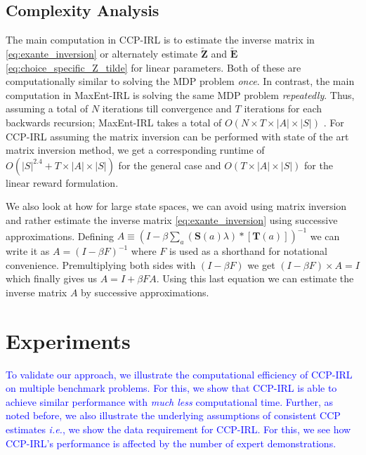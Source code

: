 \documentclass{article}
\begin{document}
\subsection{Complexity Analysis}
The main computation in CCP-IRL is to estimate the inverse matrix in \eqref{eq:exante_inversion} or alternately estimate $\tilde{\mathbf{Z}}$ and $\tilde{\mathbf{E}}$ \eqref{eq:choice_specific_Z_tilde} for linear parameters. Both of these are computationally similar to solving the MDP problem \emph{once}. 
In contrast, the main computation in MaxEnt-IRL is solving the same MDP problem \emph{repeatedly}.
Thus, assuming a total of $N$ iterations till convergence and $T$ iterations for each backwards recursion; MaxEnt-IRL takes a total of $O(N\times T \times|A|\times|S|)$ \cite{ziebart_phd}. For CCP-IRL assuming the matrix inversion can be performed with state of the art matrix inversion method, we get a corresponding runtime of $O(|S|^{2.4}+T\times|A|\times|S|)$ for the general case and $O(T\times|A|\times|S|)$ for the linear reward formulation.

We also look at how for large state spaces, we can avoid using matrix inversion and rather estimate the inverse matrix \eqref{eq:exante_inversion} using successive approximations.
Defining $A \equiv \left(I- \beta \sum_{a}(\mathbf{S}(a) \lambda) *\left[ \mathbf{T}(a)  \right]\right)^{-1}$ we can write it as $A = (I - \beta F)^{-1}$ where $F$ is used as a shorthand for notational convenience. Premultiplying both sides with $(I - \beta F)$ we get $(I - \beta F)\times A = I$ which finally gives us $A = I + \beta F A$. Using this last equation we can estimate the inverse matrix $A$ by successive approximations.

\section{Experiments} \label{experiments}

\textcolor{blue}{
To validate our approach, we illustrate the computational efficiency of CCP-IRL on multiple benchmark problems. For this, we show that CCP-IRL is able to achieve similar performance with \textit{much less} computational time. Further, as noted before, we also illustrate the underlying assumptions of consistent CCP estimates \emph{i.e.}, we show the data requirement for CCP-IRL. For this, we see how CCP-IRL's performance is affected by the number of expert demonstrations.
}
\end{document}
